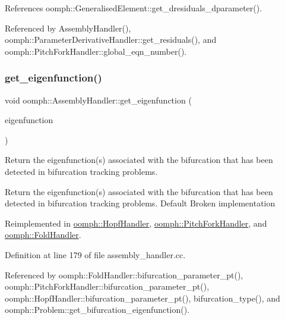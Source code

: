 References oomph\+::\+Generalised\+Element\+::get\+\_\+dresiduals\+\_\+dparameter().



Referenced by Assembly\+Handler(), oomph\+::\+Parameter\+Derivative\+Handler\+::get\+\_\+residuals(), and oomph\+::\+Pitch\+Fork\+Handler\+::global\+\_\+eqn\+\_\+number().

\mbox{\label{classoomph_1_1AssemblyHandler_a6d614b1b3809d0eb7ceb393e3ae9594f}} 
\subsubsection{\texorpdfstring{get\+\_\+eigenfunction()}{get\_eigenfunction()}}
{\footnotesize\ttfamily void oomph\+::\+Assembly\+Handler\+::get\+\_\+eigenfunction (\begin{DoxyParamCaption}\item[{\hyperlink{classoomph_1_1Vector}{Vector}$<$ \hyperlink{classoomph_1_1DoubleVector}{Double\+Vector} $>$ \&}]{eigenfunction }\end{DoxyParamCaption})\hspace{0.3cm}{\ttfamily [virtual]}}



Return the eigenfunction(s) associated with the bifurcation that has been detected in bifurcation tracking problems. 

Return the eigenfunction(s) associated with the bifurcation that has been detected in bifurcation tracking problems. Default Broken implementation 

Reimplemented in \hyperlink{classoomph_1_1HopfHandler_a9d1ee586e6274cfa0baa15f82b9fa0ae}{oomph\+::\+Hopf\+Handler}, \hyperlink{classoomph_1_1PitchForkHandler_a9d5e1388fe0ede6834a249b98168b71a}{oomph\+::\+Pitch\+Fork\+Handler}, and \hyperlink{classoomph_1_1FoldHandler_aca97058722ccc1482ae8180ea8dde74c}{oomph\+::\+Fold\+Handler}.



Definition at line 179 of file assembly\+\_\+handler.\+cc.



Referenced by oomph\+::\+Fold\+Handler\+::bifurcation\+\_\+parameter\+\_\+pt(), oomph\+::\+Pitch\+Fork\+Handler\+::bifurcation\+\_\+parameter\+\_\+pt(), oomph\+::\+Hopf\+Handler\+::bifurcation\+\_\+parameter\+\_\+pt(), bifurcation\+\_\+type(), and oomph\+::\+Problem\+::get\+\_\+bifurcation\+\_\+eigenfunction().

